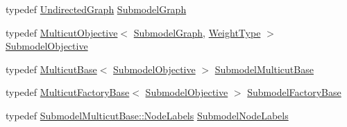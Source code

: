\begin{DoxyCompactItemize}
\item 
typedef \hyperlink{classnifty_1_1graph_1_1UndirectedGraph}{Undirected\+Graph} \hyperlink{classnifty_1_1graph_1_1MulticutDecomposer_a8b90ad3406b214b8033428adba308579}{Submodel\+Graph}
\item 
typedef \hyperlink{classnifty_1_1graph_1_1MulticutObjective}{Multicut\+Objective}$<$ \hyperlink{classnifty_1_1graph_1_1MulticutDecomposer_a8b90ad3406b214b8033428adba308579}{Submodel\+Graph}, \hyperlink{classnifty_1_1graph_1_1MulticutDecomposer_a92d62c2f46d4345e465bdfc3e2a0c2c8}{Weight\+Type} $>$ \hyperlink{classnifty_1_1graph_1_1MulticutDecomposer_a068c81973a716a49a5c38e7655e47542}{Submodel\+Objective}
\item 
typedef \hyperlink{classnifty_1_1graph_1_1MulticutBase}{Multicut\+Base}$<$ \hyperlink{classnifty_1_1graph_1_1MulticutDecomposer_a068c81973a716a49a5c38e7655e47542}{Submodel\+Objective} $>$ \hyperlink{classnifty_1_1graph_1_1MulticutDecomposer_a14dc9a97af7d8873557f7251e8c7eac1}{Submodel\+Multicut\+Base}
\item 
typedef \hyperlink{classnifty_1_1graph_1_1MulticutFactoryBase}{Multicut\+Factory\+Base}$<$ \hyperlink{classnifty_1_1graph_1_1MulticutDecomposer_a068c81973a716a49a5c38e7655e47542}{Submodel\+Objective} $>$ \hyperlink{classnifty_1_1graph_1_1MulticutDecomposer_a94775bf93c00b927a43cab26e6edbcae}{Submodel\+Factory\+Base}
\item 
typedef \hyperlink{classnifty_1_1graph_1_1MulticutBase_afba61ad2919d0fad20b3745af19309da}{Submodel\+Multicut\+Base\+::\+Node\+Labels} \hyperlink{classnifty_1_1graph_1_1MulticutDecomposer_a7c58e88129178d3cd98f511d1b44fdd5}{Submodel\+Node\+Labels}
\end{DoxyCompactItemize}

